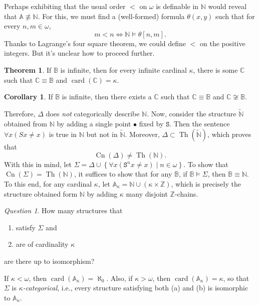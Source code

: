 \documentclass[10pt,letterpaper,cm]{nupset}
\theoremstyle{definition}
\theoremstyle{theorem}
\newtheorem{theorem}[definition]{Theorem}
\newtheorem{corollary}[definition]{Corollary}
\theoremstyle{remark}
\newtheorem*{question}{Question}
\newcommand{\A}{\mathbb A}
\newcommand{\C}{\mathbb C}
\newcommand{\N}{\mathbb N}
\renewcommand{\S}{\mathtt S}
\newcommand{\Z}{\mathbb Z}
\newcommand{\B}{\mathbb{B}}
\newcommand{\1}{\mathbf{1}}
\newcommand{\0}{\mathsf 0}
\DeclareMathOperator{\card}{\text{card}}
\DeclareMathOperator{\thh}{Th}
\DeclareMathOperator{\cn}{Cn}
\begin{document}
Perhaps exhibiting that the usual order $<$ on $\omega$ is definable in $\N$ would reveal that $\A \not \equiv \N$. For this, we must find a (well-formed) formula $\theta(x,y)$ such that for every $n,m\in \omega$, $$m<n \iff \N \models \theta[n,m].$$
Thanks to Lagrange's four square theorem, we could define $<$ on the positive integers. But it's unclear how to proceed further.

\smallskip

\begin{theorem}
If $\B$ is infinite, then for every infinite  cardinal $\kappa$, there is some $\C$ such that $\C \equiv \B$ and $\card(\C) = \kappa$.
\end{theorem}

\begin{corollary}
If $\B$ is infinite, then there exists a $\C$ such that $\C \equiv \B$ and $\C \not\cong \B$.
\end{corollary}

Therefore, $\Delta$ does \emph{not} categorically describe $\N$. Now, consider the structure $\widetilde{\N}$ obtained from $\N$ by adding a single point $\bullet$ fixed by $\S$. Then the sentence $\forall{x}\left(S{x} \ne x\right)$ is true in $\N$ but not in $\widetilde{\N}$. Moreover, $\Delta \subset \thh(\widetilde{\N})$, which proves that $$\cn(\Delta) \ne \thh(\N).$$ With this in mind, let $\Sigma = \Delta \cup \left\{ \forall{x}\left(\S^n{x} \ne x\right) \mid n \in \omega \right\}$. To show that $\cn(\Sigma) = \thh(\N)$, it suffices to show that for any $\B$, if $\B \models \Sigma$, then $\B \equiv \N$. To this end, for any cardinal $\kappa$, let $\A_{\kappa} = \N \cup \left(\kappa \times \Z\right)$, which is precisely the structure obtained form $\N$ by adding $\kappa$ many disjoint $\Z$-chains.

\begin{question}
How many structures that 
\begin{enumerate}[label=(\alph*)]
\item satisfy $\Sigma$ and 
\item are of cardinality $\kappa$ 
\end{enumerate}
are there up to isomorphism?
\end{question}

If $\kappa < \omega$, then $\card(\A_{\kappa}) = \aleph_0$. Also, if  $\kappa > \omega$, then $\card(\A_{\kappa}) = \kappa$, so that $\Sigma$ is \textit{$\kappa$-categorical}, i.e., every structure satisfying both (a) and (b) is isomorphic to $\A_{\kappa}$.  
\end{document}
